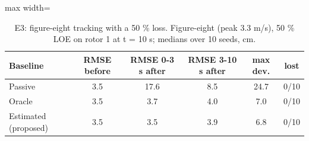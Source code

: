 \begin{table}[t]
\centering
\caption{E3: figure-eight tracking with a 50 \% loss. Figure-eight (peak 3.3 m/s), 50 \% LOE on rotor 1 at t = 10 s; medians over 10 seeds, cm.}
\label{tab:e3}
\footnotesize
\setlength{\tabcolsep}{3pt}
\begin{adjustbox}{max width=\linewidth}
\begin{tabular}{lccccc}
\toprule
Baseline & RMSE before & RMSE 0-3 s after & RMSE 3-10 s after & max dev. & lost \\
\midrule
Passive & 3.5 & 17.6 & 8.5 & 24.7 & 0/10 \\
Oracle & 3.5 & 3.7 & 4.0 & 7.0 & 0/10 \\
Estimated (proposed) & 3.5 & 3.5 & 3.9 & 6.8 & 0/10 \\
\bottomrule
\end{tabular}
\end{adjustbox}
\end{table}
